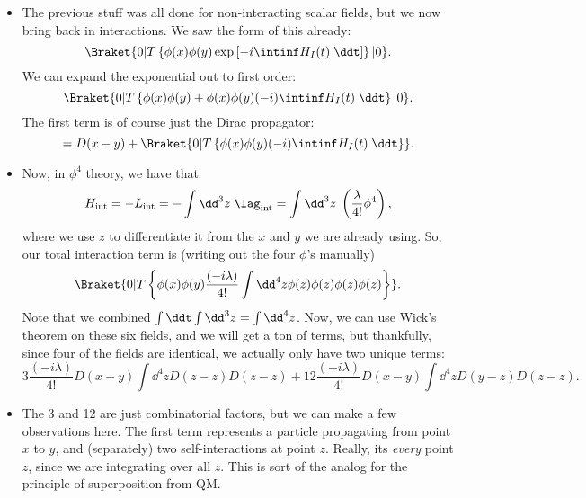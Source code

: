 \begin{itemize}
    \item The previous stuff was all done for non-interacting scalar fields, but we now bring back in interactions. We saw the form of this already:
        \begin{equation*}
            \Braket{0 | T\left\{ \phi(x)\phi(y)\exp\left[ -i\intinf H_I(t) \;\ddt \right] \right\} | 0}.
        \end{equation*}
        We can expand the exponential out to first order:
        \begin{equation*}
            \Braket{0 | T\left\{ \phi(x)\phi(y) + \phi(x)\phi(y)(-i)\intinf H_I(t)\;\ddt \right\}| 0}.
        \end{equation*}
        The first term is of course just the Dirac propagator:
        \begin{equation*}
            = D(x-y) + \Braket{0 | T\left\{ \phi(x)\phi(y)(-i)\intinf H_I(t)\;\ddt \right\}}.
        \end{equation*}
    \item Now, in $\phi^4$ theory, we have that 
        \begin{equation*}
            H_{\mathrm{int}} = -L_{\mathrm{int}} = -\int \dd^3z \;\lagint = \int \dd^3z \;\left( \frac{\lambda}{4!}\phi^4 \right),
        \end{equation*}
        where we use $z$ to differentiate it from the $x$ and $y$ we are already using. So, our total interaction term is (writing out the four $\phi$'s manually)
        \begin{equation*}
            \Braket{0 | T\left\{ \phi(x)\phi(y) \frac{(-i\lambda)}{4!} \int\dd^4z \phi(z)\phi(z)\phi(z)\phi(z) \right\}}.
        \end{equation*}
        Note that we combined $\int\ddt\int\dd^3z = \int\dd^4z$. Now, we can use Wick's theorem on these six fields, and we will get a ton of terms, but thankfully, since four of the fields are identical, we actually only have two unique terms:
        \begin{equation*}
            3 \frac{(-i\lambda)}{4!} D(x-y) \int\dd^4z D(z-z)D(z-z) + 12 \frac{(-i\lambda)}{4!} D(x-y) \int\dd^4z D(y-z)D(z-z).
        \end{equation*}
    \item The 3 and 12 are just combinatorial factors, but we can make a few observations here. The first term represents a particle propagating from point $x$ to $y$, and (separately) two self-interactions at point $z$. Really, its \textit{every} point $z$, since we are integrating over all $z$. This is sort of the analog for the principle of superposition from QM.

\end{itemize}
